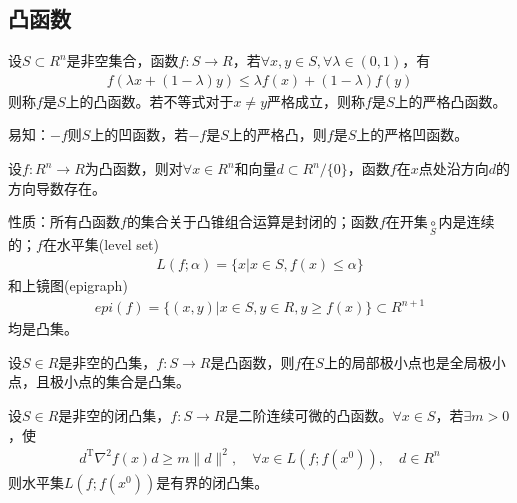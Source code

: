     \subsection{凸函数}
        \par
        \begin{definition}[凸函数]
        设$S\subset R^n$是非空集合，函数$f:S\to R$，若$\forall x,y\in S,\forall \lambda \in (0,1)$，有
        \begin{align*}
        f\left(\lambda x+(1-\lambda)y\right)\leqslant \lambda f(x)+(1-\lambda)f(y)
        \end{align*}
        则称$f$是$S$上的凸函数。若不等式对于$x\neq y$严格成立，则称$f$是$S$上的严格凸函数。
        \end{definition}
        \par
        易知：$-f$则$S$上的凹函数，若$-f$是$S$上的严格凸，则$f$是$S$上的严格凹函数。
        \begin{theorem}
        设$f:R^n\to R$为凸函数，则对$\forall x\in R^n$和向量$d\subset R^n/\{0\}$，函数$f$在$x$点处沿方向$d$的方向导数存在。
        \end{theorem}
        \par
        性质：所有凸函数$f$的集合关于凸锥组合运算是封闭的；函数$f$在开集$\mathop{\circ}\limits_{S}$内是连续的；$f$在水平集(level set)
        \begin{align*}
        L(f;\alpha) = \{x|x\in S,f(x)\leqslant \alpha\}
        \end{align*}
        和上镜图(epigraph)
        \begin{align*}
        epi(f) = \{(x,y)|x\in S,y\in R,y\geqslant f(x)\}\subset R^{n+1}
        \end{align*}
        均是凸集。
        \begin{theorem}
        设$S\in R$是非空的凸集，$f:S\to R$是凸函数，则$f$在$S$上的局部极小点也是全局极小点，且极小点的集合是凸集。
        \end{theorem}
        \begin{theorem}[水平集的有界性]
        设$S\in R$是非空的闭凸集，$f:S\to R$是二阶连续可微的凸函数。$\forall x \in S$，若$\exists m>0$，使
        \begin{align*}
        d^\mathrm{T} {\nabla}^2f(x)d \geqslant m\|d\|^2,\quad \forall x \in L(f;f(x^0)),\quad d \in R^n
        \end{align*}
        则水平集$L(f;f(x^0))$是有界的闭凸集。
        \end{theorem}
